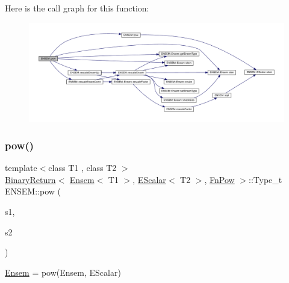 Here is the call graph for this function\+:\nopagebreak
\begin{figure}[H]
\begin{center}
\leavevmode
\includegraphics[width=350pt]{d1/d9e/group__eensem_ga08a0a61df39df2d4038eed616fcfa56b_cgraph}
\end{center}
\end{figure}
\mbox{\label{group__eensem_ga56e0a919e0060bdb32e0b2aa9ea97f11}} 
\subsubsection{\texorpdfstring{pow()}{pow()}\hspace{0.1cm}{\footnotesize\ttfamily [3/4]}}
{\footnotesize\ttfamily template$<$class T1 , class T2 $>$ \\
\mbox{\hyperlink{structENSEM_1_1BinaryReturn}{Binary\+Return}}$<$ \mbox{\hyperlink{classENSEM_1_1Ensem}{Ensem}}$<$ T1 $>$, \mbox{\hyperlink{classENSEM_1_1EScalar}{E\+Scalar}}$<$ T2 $>$, \mbox{\hyperlink{structENSEM_1_1FnPow}{Fn\+Pow}} $>$\+::Type\+\_\+t E\+N\+S\+E\+M\+::pow (\begin{DoxyParamCaption}\item[{const \mbox{\hyperlink{classENSEM_1_1Ensem}{Ensem}}$<$ T1 $>$ \&}]{s1,  }\item[{const \mbox{\hyperlink{classENSEM_1_1EScalar}{E\+Scalar}}$<$ T2 $>$ \&}]{s2 }\end{DoxyParamCaption})\hspace{0.3cm}{\ttfamily [inline]}}



\mbox{\hyperlink{classENSEM_1_1Ensem}{Ensem}} = pow(\+Ensem, E\+Scalar) 

